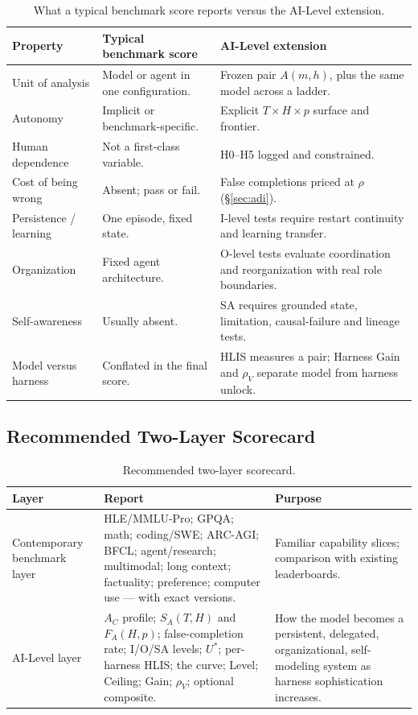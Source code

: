 \documentclass[11pt]{article}
\theoremstyle{definition}
\newcommand{\SA}{\ensuremath{S_A(T,H)}}
\newcommand{\FA}{\ensuremath{F_A(H,p)}}
\newcommand{\rhov}{\ensuremath{\rho_V}}
\begin{document}
\begin{table}[!htbp]
\centering\small
\begin{tabularx}{\textwidth}{@{}lYY@{}}
\toprule
Property & Typical benchmark score & AI-Level extension \\
\midrule
Unit of analysis & Model or agent in one configuration. & Frozen pair $A(m,h)$, plus the same model across a ladder. \\
Autonomy & Implicit or benchmark-specific. & Explicit $T \times H \times p$ surface and frontier. \\
Human dependence & Not a first-class variable. & H0--H5 logged and constrained. \\
Cost of being wrong & Absent; pass or fail. & False completions priced at $\rho$ (\S\ref{sec:adi}). \\
Persistence / learning & One episode, fixed state. & I-level tests require restart continuity and learning transfer. \\
Organization & Fixed agent architecture. & O-level tests evaluate coordination and reorganization with real role boundaries. \\
Self-awareness & Usually absent. & SA requires grounded state, limitation, causal-failure and lineage tests. \\
Model versus harness & Conflated in the final score. & HLIS measures a pair; Harness Gain and \rhov{} separate model from harness unlock. \\
\bottomrule
\end{tabularx}
\caption{What a typical benchmark score reports versus the AI-Level extension.}
\label{tab:hilext}
\end{table}

\subsection{Recommended Two-Layer Scorecard}

\begin{table}[!htbp]
\centering\small
\begin{tabularx}{\textwidth}{@{}lYY@{}}
\toprule
Layer & Report & Purpose \\
\midrule
Contemporary benchmark layer & HLE/MMLU-Pro; GPQA; math; coding/SWE; ARC-AGI; BFCL; agent/research; multimodal; long context; factuality; preference; computer use --- with exact versions. & Familiar capability slices; comparison with existing leaderboards. \\
AI-Level layer & $A_C$ profile; \SA{} and \FA{}; false-completion rate; I/O/SA levels; $U^{*}$; per-harness HLIS; the curve; Level; Ceiling; Gain; \rhov{}; optional composite. & How the model becomes a persistent, delegated, organizational, self-modeling system as harness sophistication increases. \\
\bottomrule
\end{tabularx}
\caption{Recommended two-layer scorecard.}
\label{tab:twolayer}
\end{table}
\end{document}
